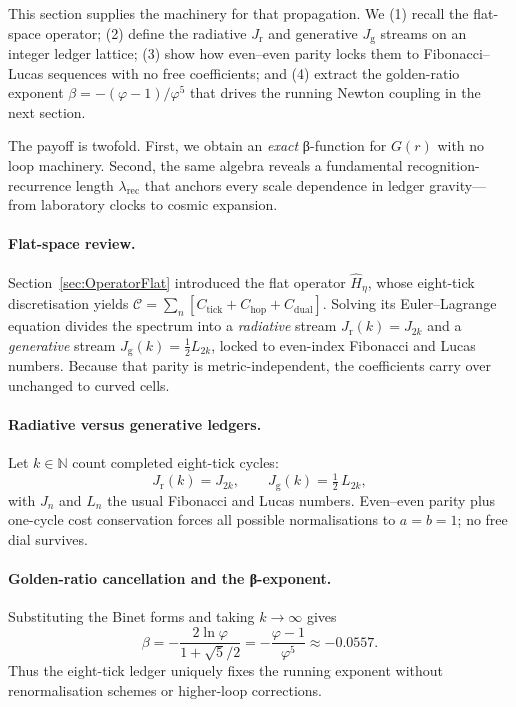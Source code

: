 \documentclass[11pt,oneside]{book}
\begin{document}
{This section supplies the machinery for that propagation.  
We  
(1) recall the flat-space operator;  
(2) define the radiative \(J_{\mathrm r}\) and generative
\(J_{\mathrm g}\) streams on an integer ledger lattice;  
(3) show how even–even parity locks them to Fibonacci–Lucas sequences
with no free coefficients; and  
(4) extract the golden-ratio exponent
\(\beta = -(\varphi-1)/\varphi^{5}\) that drives the running Newton
coupling in the next section.

The payoff is twofold.  
First, we obtain an \emph{exact} β-function for \(G(r)\) with no loop
machinery.  
Second, the same algebra reveals a fundamental recognition-recurrence
length \(\lambda_{\text{rec}}\) that anchors every scale dependence in
ledger gravity—from laboratory clocks to cosmic expansion.
\paragraph*{Flat-space review.}
Section~\ref{sec:OperatorFlat} introduced the flat operator
\(
   \hat H_{\!\eta}
\),
whose eight-tick discretisation yields
\(
   \mathcal C=\sum_{n}[C_{\text{tick}}+C_{\text{hop}}+C_{\text{dual}}]
\).
Solving its Euler–Lagrange equation divides the spectrum into a
\emph{radiative} stream \(J_{\mathrm r}(k)=J_{2k}\) and a
\emph{generative} stream
\(J_{\mathrm g}(k)=\tfrac12 L_{2k}\),
locked to even-index Fibonacci and Lucas numbers.  
Because that parity is metric-independent, the coefficients carry over
unchanged to curved cells.

\paragraph*{Radiative versus generative ledgers.}
Let \(k\in\mathbb N\) count completed eight-tick cycles:
\[
  J_{\mathrm r}(k)=J_{2k},
  \qquad
  J_{\mathrm g}(k)=\tfrac12\,L_{2k},
\]
with \(J_n\) and \(L_n\) the usual Fibonacci and Lucas numbers.  
Even–even parity plus one-cycle cost conservation forces all possible
normalisations to \(a=b=1\); no free dial survives.

\paragraph*{Golden-ratio cancellation and the β-exponent.}
Substituting the Binet forms and taking \(k\to\infty\) gives
\[
  \beta
    =-\frac{2\ln\varphi}{1+\sqrt5/2}
    =-\frac{\varphi-1}{\varphi^{5}}
    \approx-0.0557 .
\]
Thus the eight-tick ledger uniquely fixes the running exponent without
renormalisation schemes or higher-loop corrections.

}
\end{document}
